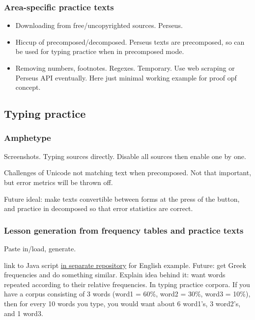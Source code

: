 \documentclass[11pt]{article}
\begin{document}
\subsubsection{Area-specific practice texts}
\label{sec:org79eeefa}

\begin{itemize}
\item Downloading from free/uncopyrighted sources. Perseus.
\item Hiccup of precomposed/decomposed. Perseus texts are precomposed, so can be used for typing practice when in precomposed mode.
\item Removing numbers, footnotes. Regexes. Temporary. Use web scraping or Perseus API eventually. Here just minimal working example for proof opf concept.
\end{itemize}

\subsection{Typing practice}
\label{sec:org1f6e38d}

\subsubsection{Amphetype}
\label{sec:orgf5ecc51}

Screenshots. Typing sources directly. Disable all sources then enable one by one.

Challenges of Unicode not matching text when precomposed. Not that important, but error metrics will be thrown off.

Future ideal: make texts convertible between forms at the press of the button, and practice in decomposed so that error statistics are correct.

\subsubsection{Lesson generation from frequency tables and practice texts}
\label{sec:org519d66e}

Paste in/load, generate.

link to Java script \href{https://github.com/StevenTammen/amphetype-texts/blob/master/src/FrequencyLists.java}{in separate repository} for English example. Future: get Greek frequencies and do something similar. Explain idea behind it: want words repeated according to their relative frequencies. In typing practice corpora. If you have a corpus consisting of 3 words (word1 = 60\%, word2 = 30\%, word3 = 10\%), then for every 10 words you type, you would want about 6 word1's, 3 word2's, and 1 word3.
\end{document}
